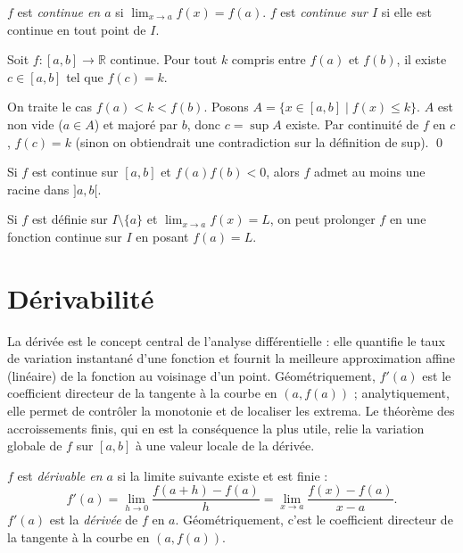 \documentclass[11pt,a4paper,twoside]{book}
\newcommand{\R}{\mathbb{R}}
\begin{document}
\begin{definitionbox}
$f$ est \emph{continue en $a$} si $\lim_{x\to a} f(x) = f(a)$.
$f$ est \emph{continue sur $I$} si elle est continue en tout point de $I$.
\end{definitionbox}

\begin{theoremebox}
Soit $f : [a,b] \to \R$ continue. Pour tout $k$ compris entre $f(a)$ et $f(b)$, il existe $c \in [a,b]$ tel que $f(c) = k$.
\end{theoremebox}

\begin{preuvebox}
On traite le cas $f(a) < k < f(b)$. Posons $A = \{x \in [a,b] \mid f(x) \leq k\}$.
$A$ est non vide ($a \in A$) et majoré par $b$, donc $c = \sup A$ existe.
Par continuité de $f$ en $c$, $f(c) = k$ (sinon on obtiendrait une contradiction sur la définition de sup). \qed
\end{preuvebox}

\begin{theoremebox}
Si $f$ est continue sur $[a,b]$ et $f(a)f(b) < 0$, alors $f$ admet au moins une racine dans $]a,b[$.
\end{theoremebox}

\begin{definitionbox}
Si $f$ est définie sur $I \setminus \{a\}$ et $\lim_{x\to a} f(x) = L$, on peut prolonger $f$ en une fonction continue sur $I$ en posant $f(a) = L$.
\end{definitionbox}

\section{Dérivabilité}

La dérivée est le concept central de l'analyse différentielle : elle quantifie le taux de variation instantané d'une fonction et fournit la meilleure approximation affine (linéaire) de la fonction au voisinage d'un point. Géométriquement, $f'(a)$ est le coefficient directeur de la tangente à la courbe en $(a, f(a))$ ; analytiquement, elle permet de contrôler la monotonie et de localiser les extrema. Le théorème des accroissements finis, qui en est la conséquence la plus utile, relie la variation globale de $f$ sur $[a,b]$ à une valeur locale de la dérivée.

\begin{definitionbox}
$f$ est \emph{dérivable en $a$} si la limite suivante existe et est finie :
\[
  f'(a) = \lim_{h\to 0}\frac{f(a+h)-f(a)}{h} = \lim_{x\to a}\frac{f(x)-f(a)}{x-a}.
\]
$f'(a)$ est la \emph{dérivée} de $f$ en $a$. Géométriquement, c'est le coefficient directeur de la tangente à la courbe en $(a,f(a))$.
\end{definitionbox}
\end{document}
